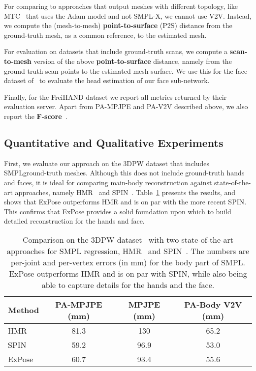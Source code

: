 \documentclass[runningheads]{llncs}
\newcommand{\modelname}{\mbox{ExPose}\xspace}
\newcommand{\smplx}{\mbox{SMPL-X}\xspace}
\newcommand{\groundtruth}{\mbox{ground-truth}\xspace}
\newcommand{\freihand}{\mbox{FreiHAND}\xspace}
\newcommand{\adam}{\mbox{Adam}\xspace}
\newcommand{\smpl}{\mbox{SMPL}\xspace}
\begin{document}
For comparing to approaches that output meshes with different topology, like MTC~\cite{Xiang_2019_CVPR} that uses the \adam model and not \smplx, we cannot use V2V. Instead, we compute the (mesh-to-mesh) \textbf{point-to-surface} (P2S)
distance from the \groundtruth mesh, as a common reference, to the estimated mesh.

For evaluation on datasets that include \groundtruth scans, we compute a \textbf{scan-to-mesh} version of the above \textbf{point-to-surface} distance,
namely from the \groundtruth scan points to the estimated mesh surface.
We use this for the face dataset of~\cite{feng2018evaluation} to evaluate the head estimation of our face sub-network.

Finally, for the \freihand dataset \cite{Freihand2019} we report all metrics returned by their evaluation server.
Apart from PA-MPJPE and PA-V2V described above, we also report the \textbf{F-score}~\cite{knapitsch2017tanks}.
 

\subsection{Quantitative and Qualitative Experiments}
\label{subsec:main_experiments}

First, we evaluate our approach on the 3DPW dataset that includes \smpl \groundtruth meshes.
Although this does not include \groundtruth hands and faces, it is ideal for comparing main-body reconstruction against state-of-the-art approaches, namely HMR~\cite{kanazawa_cvpr_2018} and SPIN~\cite{Kolotouros_2019_ICCV}.
Table~\ref{table:pose_results_3dpw} presents the results, and shows that \modelname outperforms HMR and is on par with the more recent SPIN.
This confirms that \modelname provides a solid foundation upon which to build
detailed reconstruction for the hands and face.

\begin{table}[t!]
    \centering
    \caption{
        Comparison on the 3DPW dataset~\cite{vonmarcard_eccv_2018_3dpw}
        with two state-of-the-art approaches for \smpl regression,
        HMR~\cite{kanazawa_cvpr_2018} and SPIN~\cite{Kolotouros_2019_ICCV}.
        The numbers are per-joint and per-vertex errors (in mm) for the body
        part of \smpl.
        \modelname outperforms HMR and is on par with SPIN, while also
        being able to capture details for the hands and the face.
    }
    \scriptsize
    \begin{tabular}{l|c|c|c}
        \toprule
        Method & PA-MPJPE (mm) & MPJPE (mm) & PA-Body V2V (mm) \\
        \toprule
        HMR    \cite{kanazawa_cvpr_2018}  & 81.3 &  130  &  65.2 \\
        SPIN    \cite{Kolotouros_2019_ICCV} & 59.2  & 96.9 & 53.0 \\
        \modelname & 60.7  & 93.4 &  55.6 \\
        \bottomrule
    \end{tabular}
    \label{table:pose_results_3dpw}
\end{table}
\end{document}
